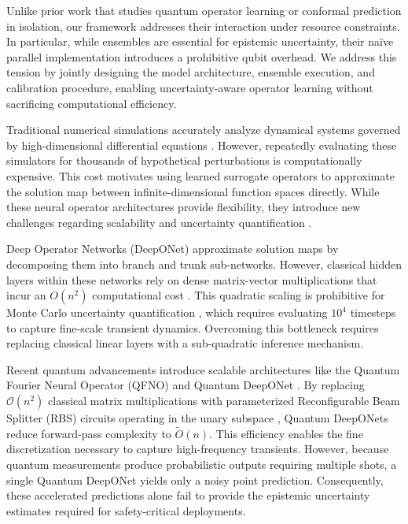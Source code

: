 \documentclass{iopjournal}
\begin{document}
Unlike prior work that studies quantum operator learning or conformal prediction in isolation, our framework addresses their interaction under resource constraints. In particular, while ensembles are essential for epistemic uncertainty, their naïve parallel implementation introduces a prohibitive qubit overhead. We address this tension by jointly designing the model architecture, ensemble execution, and calibration procedure, enabling uncertainty-aware operator learning without sacrificing computational efficiency.

Traditional numerical simulations accurately analyze dynamical systems governed by high-dimensional differential equations \cite{dahlquist2008numerical, butcher2016numerical, liu2019mcsimulation}. However, repeatedly evaluating these simulators for thousands of hypothetical perturbations is computationally expensive. This cost motivates using learned surrogate operators \cite{lu2021deeponet, li2023neuraloperators, azizzadenesheli2024neuraloperators, wen2022neuraloperator} to approximate the solution map between infinite-dimensional function spaces directly. While these neural operator architectures provide flexibility, they introduce new challenges regarding scalability and uncertainty quantification \cite{psaros2023uq, zou2024operatoruq, azizzadenesheli2024neuraloperators, xiao2025qdon, kerenidis2022qorthonn, landman2022medicalqorthonn}.

Deep Operator Networks (DeepONet) \cite{lu2021deeponet, lu2022deeponetcomparison, lu2022multifidelitydeeponet, lin2023responsedeeponet} approximate solution maps by decomposing them into branch and trunk sub-networks. However, classical hidden layers within these networks rely on dense matrix-vector multiplications that incur an $O(n^2)$ computational cost \cite{kerenidis2022qorthonn, landman2022medicalqorthonn, goodfellow2016deeplearning}. This quadratic scaling is prohibitive for Monte Carlo uncertainty quantification \cite{zhang2021mccost, milanovic2017mccost, ye2023mccost}, which requires evaluating $10^4$ timesteps to capture fine-scale transient dynamics. Overcoming this bottleneck requires replacing classical linear layers with a sub-quadratic inference mechanism.

Recent quantum advancements introduce scalable architectures like the Quantum Fourier Neural Operator (QFNO) \cite{jain2024qfno} and Quantum DeepONet \cite{xiao2025qdon}. By replacing $\mathcal{O}(n^2)$ classical matrix multiplications with parameterized Reconfigurable Beam Splitter (RBS) circuits operating in the unary subspace \cite{kerenidis2022qorthonn, landman2022medicalqorthonn, xiao2025qdon}, Quantum DeepONets reduce forward-pass complexity to $\tilde{O}(n)$. This efficiency enables the fine discretization necessary to capture high-frequency transients. However, because quantum measurements produce probabilistic outputs requiring multiple shots, a single Quantum DeepONet yields only a noisy point prediction. Consequently, these accelerated predictions alone fail to provide the epistemic uncertainty estimates required for safety-critical deployments.
\end{document}
